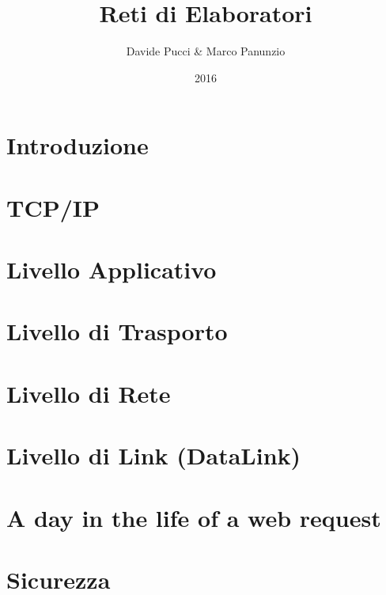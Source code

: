 

\title{Reti di Elaboratori}
\author{Davide Pucci \& Marco Panunzio}
\date{2016}



\maketitle

\tableofcontents

\chapter{Introduzione}


\chapter{TCP/IP}


\chapter{Livello Applicativo}


\chapter{Livello di Trasporto}


\chapter{Livello di Rete}


\chapter{Livello di Link (DataLink)}


\chapter{A day in the life of a web request}


\chapter{Sicurezza}



